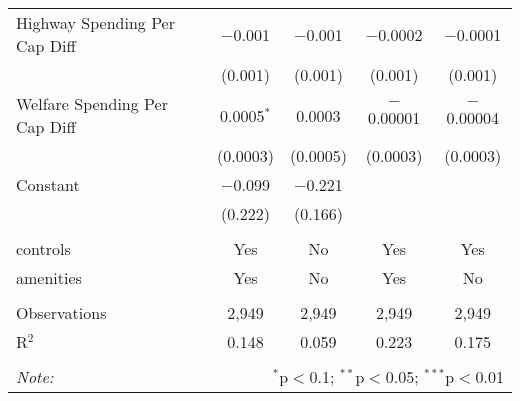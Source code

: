 \begin{table}[!htbp]
\begin{tabular}{@{\extracolsep{5pt}}lcccc}
  Highway Spending Per Cap Diff & $-$0.001 & $-$0.001 & $-$0.0002 & $-$0.0001 \\ 
  & (0.001) & (0.001) & (0.001) & (0.001) \\ 
  Welfare Spending Per Cap Diff & 0.0005$^{*}$ & 0.0003 & $-$0.00001 & $-$0.00004 \\ 
  & (0.0003) & (0.0005) & (0.0003) & (0.0003) \\ 
  Constant & $-$0.099 & $-$0.221 &  &  \\ 
  & (0.222) & (0.166) &  &  \\ 
 \hline \\[-1.8ex] 
controls & Yes & No & Yes & Yes \\ 
amenities & Yes & No & Yes & No \\ 
\hline \\[-1.8ex] 
Observations & 2,949 & 2,949 & 2,949 & 2,949 \\ 
R$^{2}$ & 0.148 & 0.059 & 0.223 & 0.175 \\ 
\hline 
\hline \\[-1.8ex] 
\textit{Note:}  & \multicolumn{4}{r}{$^{*}$p$<$0.1; $^{**}$p$<$0.05; $^{***}$p$<$0.01} \\ 
\end{tabular} 
\end{table} 
